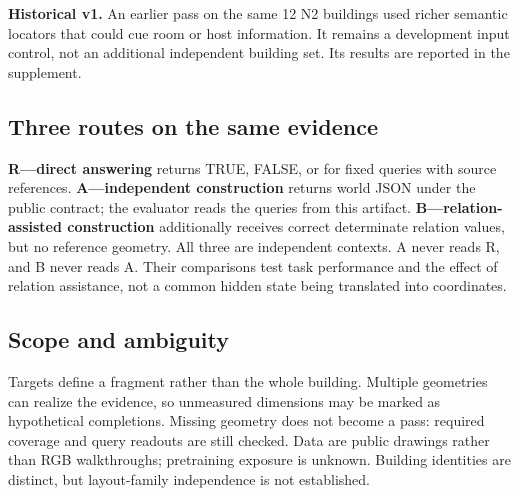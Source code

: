 \textbf{Historical v1.}
An earlier pass on the same 12 N2 buildings used richer semantic locators
that could cue room or host information. It remains a development input
control, not an additional independent building set. Its results are
reported in the supplement.

\subsection{Three routes on the same evidence}
\textbf{R---direct answering} returns TRUE, FALSE, or \unk{} for fixed
queries with source references.
\textbf{A---independent construction} returns world JSON under the public
contract; the evaluator reads the queries from this artifact.
\textbf{B---relation-assisted construction} additionally receives correct
determinate relation values, but no reference geometry.
All three are independent contexts. A never reads R, and B never reads A.
Their comparisons test task performance and the effect of relation
assistance, not a common hidden state being translated into coordinates.

\subsection{Scope and ambiguity}
Targets define a fragment rather than the whole building. Multiple
geometries can realize the evidence, so unmeasured dimensions may be
marked as hypothetical completions. Missing geometry does not become a
pass: required coverage and query readouts are still checked. Data are
public drawings rather than RGB walkthroughs; pretraining exposure is
unknown. Building identities are distinct, but layout-family independence
is not established.
